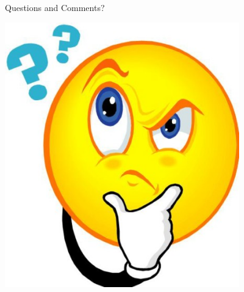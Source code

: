 \documentclass[t,presentation]{beamer}
\begin{document}
\begin{frame}[label={sec:org2f49c0e}]{Questions and Comments?}
\begin{center}
\includegraphics[width=4.0in]{figures/Question-mark.jpg}
\end{center}
\end{frame}
\end{document}
